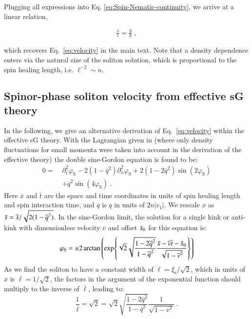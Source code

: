 \documentclass[aps,

               pra,
               twocolumn,
               amsmath,
               amssymb,
               superscriptaddress,
               reprint,
               10pt
              ]{revtex4-2}
\newcommand{\phis}{\varphi_\mathrm{S}}
\begin{document}
\begin{appendix}
Plugging all expressions into Eq. \eqref{eq:Spin-Nematic-continuity},
we arrive at a linear relation,

\begin{align}
    \frac{v}{\ell} = \frac{q}{\hbar} \; ,
\end{align}

which recovers Eq.~\eqref{eq:velocity} in the main text.
Note that a density dependence enters via the natural size of the soliton solution, which is proportional to the spin healing length, i.e.  $\ell^{-2}\sim n$.

\subsection{Spinor-phase soliton velocity from effective sG theory\label{VelocityCalcEFT}}
In the following, we give an alternative derivation of Eq.~\eqref{eq:velocity} within the effective sG theory.
With the Lagrangian given in \cite{Siovitz2025} (where only density fluctuations for small momenta were taken into account in the derivation of the effective theory)
the double sine-Gordon equation is found to be:
\begin{align}
         0= \; &\partial^2_{\overline{t}}\phis-2(1-\overline{q}^2)\partial^2_{\overline{x}}\phis +2(1-2\overline{q}^2)\sin{(2\phis)}\nonumber \\ &+\overline{q}^2\sin{(4\phis)} \; .
\end{align}
Here $\overline{x}$ and $\overline{t}$ are the space and time coordinates in units of spin healing length and spin interaction time, and $\overline{q}$ is $q$ in units of $2n|c_1|$.
We rescale $\overline{x}$ as $\Tilde{x} = \overline{x}/\sqrt{2(1-\overline{q}^2)}$.
In the sine-Gordon limit, the solution for a single kink or anti-kink with dimensionless velocity $\overline{v}$ and offset $\Tilde{x}_0$ for this equation is:
\begin{equation}
    \phis=\pm2\arctan{\left(\exp{\sqrt{2}\sqrt{\frac{1-2\overline{q}^2}{1-\overline{q}^2}}\frac{\Tilde{x}-\overline{v} \overline{t}-\Tilde{x}_0}{\sqrt{1-\overline{v}^2}}}\right)}
\end{equation}
As we find the soliton to have a constant width of $\ell= \xi_\mathrm{s}/\sqrt{2}$, which in units of $\overline{x}$ is $\overline{\ell}=1/\sqrt{2}$, the factors in the argument of the exponential function should multiply to the inverse of $\overline{\ell}$, leading to:
\begin{equation}
    \frac{1}{\overline{\ell}} = \sqrt{2} = \sqrt{2}\sqrt{\frac{1-2\overline{q}^2}{1-\overline{q}^2}}\frac{1}{\sqrt{1-\overline{v}^2}} \; .

\end{equation}
\end{appendix}
\end{document}
